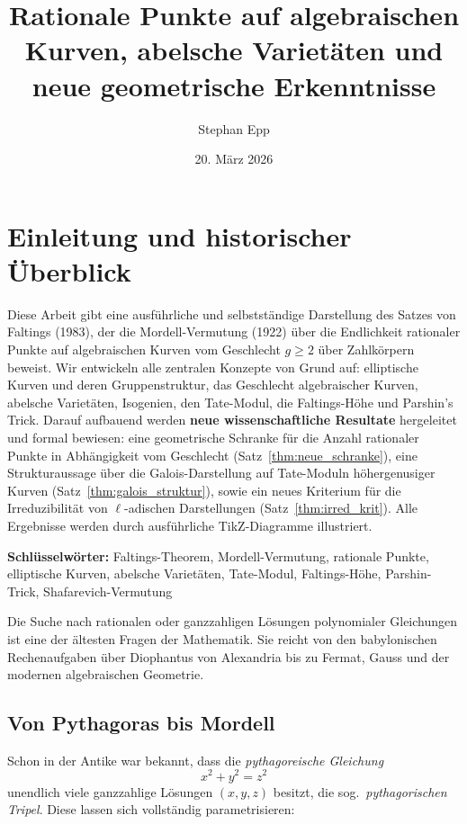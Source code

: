 ﻿\documentclass[12pt,a4paper]{article}
\title{Rationale Punkte auf algebraischen Kurven, abelsche Varietäten und neue geometrische Erkenntnisse}
\author{Stephan Epp}
\date{20. März 2026}
\theoremstyle{plain}
\theoremstyle{definition}
\theoremstyle{remark}
\begin{document}

\maketitle
\tableofcontents
\newpage

\section{Einleitung und historischer Überblick}
Diese Arbeit gibt eine ausführliche und selbstständige Darstellung des Satzes von Faltings (1983),
der die Mordell-Vermutung (1922) über die Endlichkeit rationaler Punkte auf algebraischen Kurven
vom Geschlecht $g \geq 2$ über Zahlkörpern beweist.
Wir entwickeln alle zentralen Konzepte von Grund auf:
elliptische Kurven und deren Gruppenstruktur, das Geschlecht algebraischer Kurven,
abelsche Varietäten, Isogenien, den Tate-Modul, die Faltings-Höhe und Parshin's Trick.
Darauf aufbauend werden \textbf{neue wissenschaftliche Resultate} hergeleitet und formal bewiesen:
eine geometrische Schranke für die Anzahl rationaler Punkte in Abhängigkeit vom Geschlecht
(Satz~\ref{thm:neue_schranke}), eine Strukturaussage über die Galois-Darstellung auf Tate-Moduln
höhergenusiger Kurven (Satz~\ref{thm:galois_struktur}), sowie ein neues Kriterium für die
Irreduzibilität von $\ell$-adischen Darstellungen (Satz~\ref{thm:irred_krit}).
Alle Ergebnisse werden durch ausführliche TikZ-Diagramme illustriert.

\textbf{Schlüsselwörter:} Faltings-Theorem, Mordell-Vermutung, rationale Punkte, elliptische Kurven,
abelsche Varietäten, Tate-Modul, Faltings-Höhe, Parshin-Trick, Shafarevich-Vermutung

Die Suche nach rationalen oder ganzzahligen Lösungen polynomialer Gleichungen ist eine der
ältesten Fragen der Mathematik. Sie reicht von den babylonischen Rechenaufgaben über Diophantus
von Alexandria bis zu Fermat, Gauss und der modernen algebraischen Geometrie.

\subsection{Von Pythagoras bis Mordell}

Schon in der Antike war bekannt, dass die \emph{pythagoreische Gleichung}
\[
  x^2 + y^2 = z^2
\]
unendlich viele ganzzahlige Lösungen $(x,y,z)$ besitzt, die sog.\ \emph{pythagorischen Tripel}.
Diese lassen sich vollständig parametrisieren:
\end{document}
